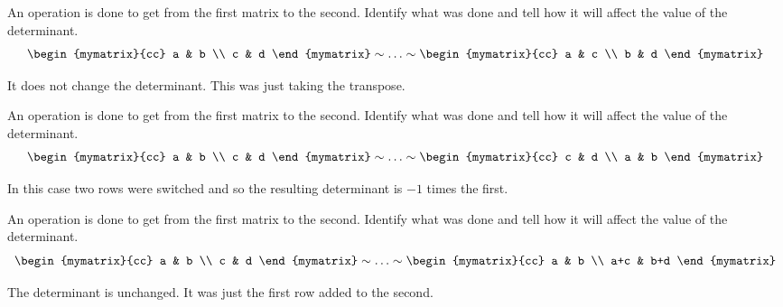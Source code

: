 \begin{enumialphparenastyle}

\begin{ex} An operation is done to get from the first matrix to the second.
Identify what was done and tell how it will affect the value of the
determinant. 
\begin{equation*}
\begin{mymatrix}{cc}
a & b \\
c & d
\end{mymatrix}  \sim \ldots \sim \begin{mymatrix}{cc}
a & c \\
b & d
\end{mymatrix}
\end{equation*}
\begin{sol}
It does not change the determinant. This was just taking the transpose.
\end{sol}
\end{ex}

\begin{ex} An operation is done to get from the first matrix to the second.
Identify what was done and tell how it will affect the value of the
determinant. 
\begin{equation*}
\begin{mymatrix}{cc}
a & b \\
c & d
\end{mymatrix} \sim \ldots \sim \begin{mymatrix}{cc}
c & d \\
a & b
\end{mymatrix}
\end{equation*}
\begin{sol}
In this case two rows were switched and so the resulting determinant is $-1$
times the first.
\end{sol}
\end{ex}


\begin{ex} An operation is done to get from the first matrix to the second.
Identify what was done and tell how it will affect the value of the
determinant. 
\begin{equation*}
\begin{mymatrix}{cc}
a & b \\
c & d
\end{mymatrix} \sim \ldots \sim \begin{mymatrix}{cc}
a & b \\
a+c & b+d
\end{mymatrix}
\end{equation*}
\begin{sol}
The determinant is unchanged. It was just the first row added to the second.
\end{sol}
\end{ex}



\end{enumialphparenastyle}
